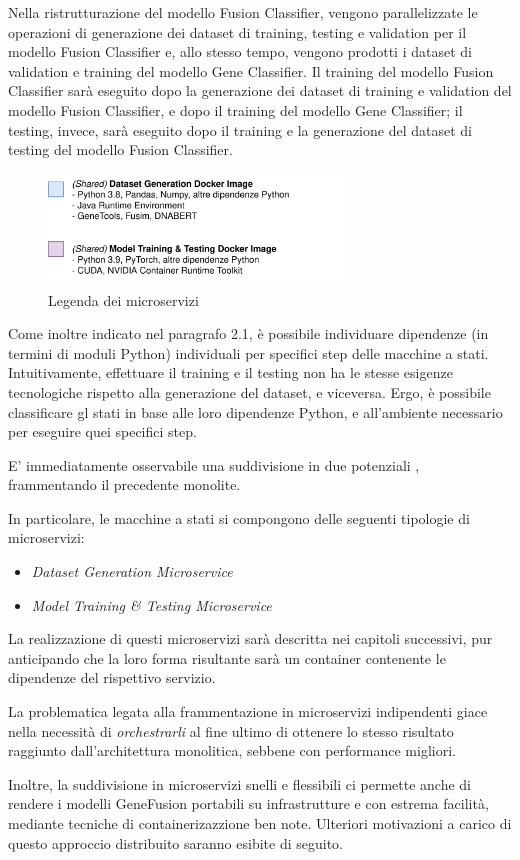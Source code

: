 Nella ristrutturazione del modello Fusion Classifier, vengono parallelizzate le operazioni di generazione dei dataset di training, testing e validation per il modello Fusion Classifier e, allo stesso tempo, vengono prodotti i dataset di validation e training del modello Gene Classifier. Il training del modello Fusion Classifier sarà eseguito dopo la generazione dei dataset di training e validation del modello Fusion Classifier, e dopo il training del modello Gene Classifier; il testing, invece, sarà eseguito dopo il training e la generazione del dataset di testing del modello Fusion Classifier.

\begin{figure}[h]
    \centering
    \includegraphics[width=300px]{figures/ch2/dependencies.png}
    \caption[Legenda dei microservizi]{Legenda dei microservizi}
    \label{fig:cha2:deps}
\end{figure}

Come inoltre indicato nel paragrafo 2.1, è possibile individuare dipendenze (in termini di moduli Python) individuali per specifici step delle macchine a stati. Intuitivamente, effettuare il training e il testing non ha le stesse esigenze tecnologiche rispetto alla generazione del dataset, e viceversa. Ergo, è possibile classificare gl stati in base alle loro dipendenze Python, e all'ambiente necessario per eseguire quei specifici step.

E' immediatamente osservabile una suddivisione in due potenziali , frammentando il precedente monolite.

In particolare, le macchine a stati si compongono delle seguenti tipologie di microservizi:

\begin{itemize}
    \item {\em Dataset Generation Microservice}
    \item {\em Model Training \& Testing Microservice}
\end{itemize}

La realizzazione di questi microservizi sarà descritta nei capitoli successivi, pur anticipando che la loro forma risultante sarà un container  contenente le dipendenze del rispettivo servizio.

La problematica legata alla frammentazione in microservizi indipendenti giace nella necessità di {\em orchestrarli} al fine ultimo di ottenere lo stesso risultato raggiunto dall'architettura monolitica, sebbene con performance migliori.

Inoltre, la suddivisione in microservizi snelli e flessibili ci permette anche di rendere i modelli GeneFusion portabili su infrastrutture  e  con estrema facilità, mediante tecniche di containerizazzione ben note. Ulteriori motivazioni a carico di questo approccio distribuito saranno esibite di seguito.